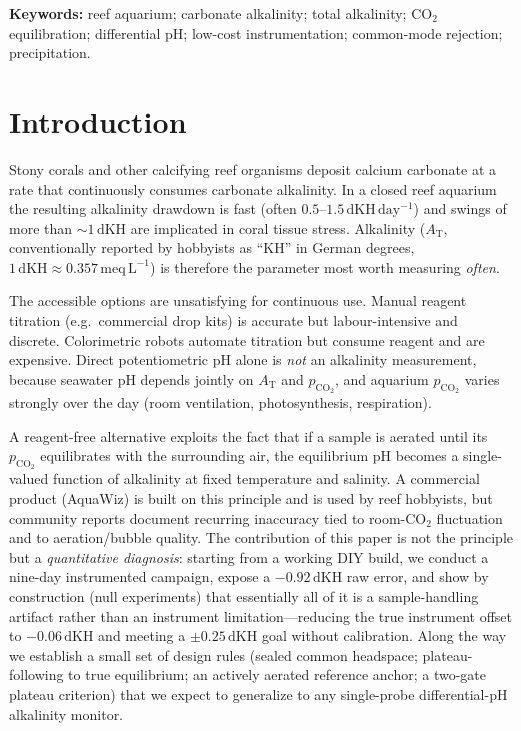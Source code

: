 \documentclass[11pt]{article}
\newcommand{\dkh}{\ensuremath{\,\mathrm{dKH}}}
\newcommand{\co}{\ensuremath{\mathrm{CO_2}}}
\newcommand{\pco}{\ensuremath{p_{\mathrm{CO_2}}}}
\newcommand{\at}{\ensuremath{A_\mathrm{T}}}
\begin{document}
\noindent\textbf{Keywords:} reef aquarium; carbonate alkalinity; total
alkalinity; \co{} equilibration; differential pH; low-cost instrumentation;
common-mode rejection;  precipitation.

\section{Introduction}
Stony corals and other calcifying reef organisms deposit calcium carbonate at
a rate that continuously consumes carbonate alkalinity. In a closed reef
aquarium the resulting alkalinity drawdown is fast (often
$0.5$--$1.5\dkh\,\mathrm{day^{-1}}$) and swings of more than $\sim1\dkh$ are
implicated in coral tissue stress. Alkalinity (\at{}, conventionally reported
by hobbyists as ``KH'' in German degrees, $1\dkh \approx
0.357\,\mathrm{meq\,L^{-1}}$) is therefore the parameter most worth measuring
\emph{often}.

The accessible options are unsatisfying for continuous use. Manual reagent
titration (e.g.\ commercial drop kits) is accurate but labour-intensive and
discrete. Colorimetric robots automate titration but consume reagent and are
expensive. Direct potentiometric pH alone is \emph{not} an alkalinity measurement,
because seawater pH depends jointly on \at{} and \pco{}, and aquarium \pco{}
varies strongly over the day (room ventilation, photosynthesis, respiration).

A reagent-free alternative exploits the fact that if a sample is aerated until
its \pco{} equilibrates with the surrounding air, the equilibrium pH becomes a
single-valued function of alkalinity at fixed temperature and salinity. A
commercial product (AquaWiz) is built on this principle and is used by reef
hobbyists, but community reports document recurring inaccuracy tied to room-\co{}
fluctuation and to aeration/bubble quality. The contribution of this paper is
not the principle but a \emph{quantitative diagnosis}: starting from a working
DIY build, we conduct a nine-day instrumented campaign, expose a $-0.92\dkh$ raw error,
and show by construction (null experiments) that essentially all of it is a
sample-handling artifact rather than an instrument limitation---reducing the
true instrument offset to $-0.06\dkh$ and meeting a $\pm0.25\dkh$ goal without
calibration. Along the way we establish a small set of design rules (sealed
common headspace; plateau-following to true equilibrium; an actively aerated
reference anchor; a two-gate plateau criterion) that we expect to generalize to
any single-probe differential-pH alkalinity monitor.
\end{document}
